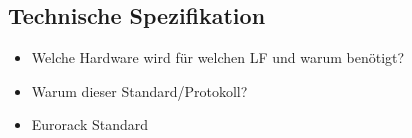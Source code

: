 \newpage
\subsection{Technische Spezifikation}
\begin{itemize}
    \item Welche Hardware wird für welchen LF und warum benötigt?
    \item Warum dieser Standard/Protokoll?
    \item Eurorack Standard
\end{itemize}


